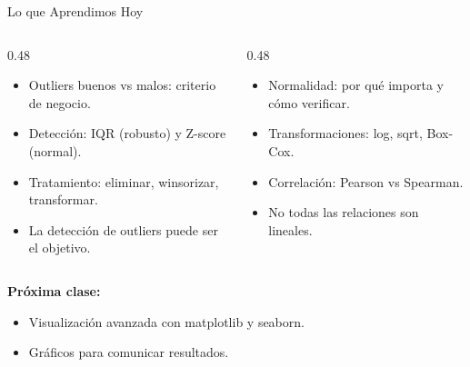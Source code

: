 \documentclass[aspectratio=169, 11pt]{beamer}
\begin{document}
\begin{frame}{Lo que Aprendimos Hoy}
  \vspace{-4pt}
  \begin{columns}[T]
    \begin{column}{0.48\textwidth}
      {\footnotesize
      \begin{itemize}\setlength{\itemsep}{4pt}
        \item[{\color{codeGreen}\faCheckCircle}]
          Outliers buenos vs malos: criterio de negocio.
        \item[{\color{codeGreen}\faCheckCircle}]
          Detección: IQR (robusto) y Z-score (normal).
        \item[{\color{codeGreen}\faCheckCircle}]
          Tratamiento: eliminar, winsorizar, transformar.
        \item[{\color{codeGreen}\faCheckCircle}]
          La detección de outliers puede ser el objetivo.
      \end{itemize}
      }
    \end{column}

    \begin{column}{0.48\textwidth}
      {\footnotesize
      \begin{itemize}\setlength{\itemsep}{4pt}
        \item[{\color{codeGreen}\faCheckCircle}]
          Normalidad: por qué importa y cómo verificar.
        \item[{\color{codeGreen}\faCheckCircle}]
          Transformaciones: log, sqrt, Box-Cox.
        \item[{\color{codeGreen}\faCheckCircle}]
          Correlación: Pearson vs Spearman.
        \item[{\color{codeGreen}\faCheckCircle}]
          No todas las relaciones son lineales.
      \end{itemize}
      }
    \end{column}
  \end{columns}

  \vspace{6pt}
  {\small\color{arcaDark}\bfseries Próxima clase:}
  \vspace{2pt}
  {\footnotesize
  \begin{itemize}\setlength{\itemsep}{2pt}
    \item[{\color{arcaRed}\faArrowRight}]
      Visualización avanzada con matplotlib y seaborn.
    \item[{\color{arcaRed}\faArrowRight}]
      Gráficos para comunicar resultados.
  \end{itemize}
  }
\end{frame}
\end{document}
